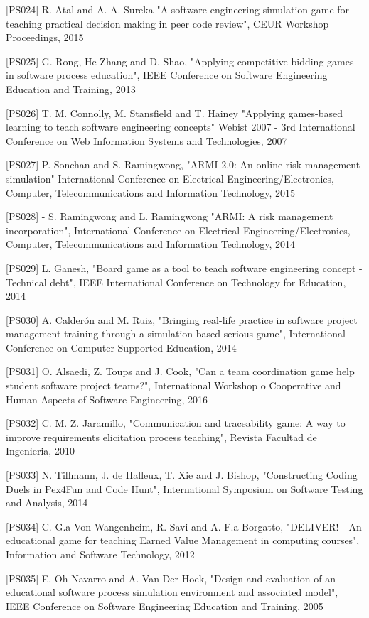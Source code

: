[PS024]	R. Atal and A. A. Sureka "A software engineering simulation game for teaching practical decision making in peer code review", CEUR Workshop Proceedings, 2015

[PS025]	G. Rong, He Zhang and D. Shao, "Applying competitive bidding games in software process education", IEEE Conference on Software Engineering Education and Training, 2013

[PS026]	T. M. Connolly, M. Stansfield and T. Hainey "Applying games-based learning to teach software engineering concepts" Webist 2007 - 3rd International Conference on Web Information Systems and Technologies, 2007

[PS027]	P. Sonchan and S. Ramingwong, "ARMI 2.0: An online risk management simulation" International Conference on Electrical Engineering/Electronics, Computer, Telecommunications and Information Technology, 2015

[PS028] - S. Ramingwong and L. Ramingwong "ARMI: A risk management incorporation", International Conference on Electrical Engineering/Electronics, Computer, Telecommunications and Information Technology, 2014

[PS029]	L. Ganesh, "Board game as a tool to teach software engineering concept - Technical debt", IEEE International Conference on Technology for Education, 2014

[PS030]	A. Calderón and M. Ruiz, "Bringing real-life practice in software project management training through a simulation-based serious game", International Conference on Computer Supported Education, 2014

[PS031]	O. Alsaedi, Z. Toups and J. Cook, "Can a team coordination game help student software project teams?", International Workshop o Cooperative and Human Aspects of Software Engineering, 2016

[PS032]	C. M. Z. Jaramillo, "Communication and traceability game: A way to improve requirements elicitation process teaching", Revista Facultad de Ingenieria, 2010

[PS033]	N. Tillmann, J. de Halleux, T. Xie and J. Bishop, "Constructing Coding Duels in Pex4Fun and Code Hunt", International Symposium on Software Testing and Analysis, 2014

[PS034]	C. G.a Von Wangenheim, R. Savi and A. F.a Borgatto, "DELIVER! - An educational game for teaching Earned Value Management in computing courses", Information and Software Technology, 2012

[PS035]	E. Oh Navarro and A. Van Der Hoek, "Design and evaluation of an educational software process simulation environment and associated model", IEEE Conference on Software Engineering Education and Training, 2005

